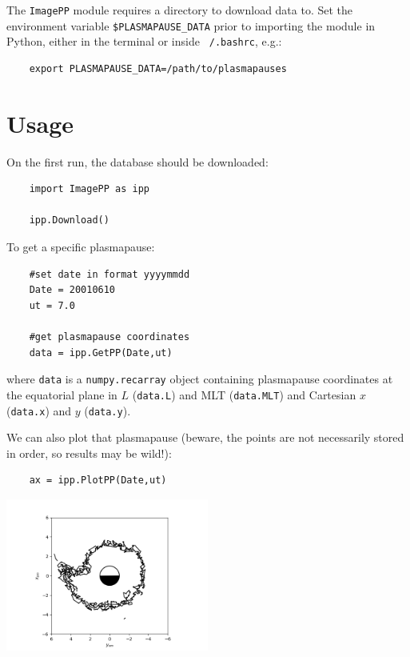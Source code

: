 	The \texttt{ImagePP} module requires a directory to download data to. Set the environment variable \texttt{\$PLASMAPAUSE\_DATA} prior to importing the module in Python, either in the terminal or inside \texttt{~/.bashrc}, e.g.:
	\begin{verbatim}
	export PLASMAPAUSE_DATA=/path/to/plasmapauses
	\end{verbatim}
	
	\section{Usage}
	
	On the first run, the database should be downloaded:
	\begin{verbatim}
	import ImagePP as ipp
	
	ipp.Download()
	\end{verbatim}
	
	To get a specific plasmapause:
	\begin{verbatim}
	#set date in format yyyymmdd
	Date = 20010610
	ut = 7.0
	
	#get plasmapause coordinates
	data = ipp.GetPP(Date,ut)
	\end{verbatim}
	
	where \texttt{data} is a \texttt{numpy.recarray} object containing plasmapause coordinates at the equatorial plane in $L$ (\texttt{data.L}) and MLT (\texttt{data.MLT}) and Cartesian $x$ (\texttt{data.x}) and $y$ (\texttt{data.y}).
	
	We can also plot that plasmapause (beware, the points are not necessarily stored in order, so results may be wild!):
	\begin{verbatim}
	ax = ipp.PlotPP(Date,ut)
	\end{verbatim}
	\includegraphics[width=0.5\textwidth]{figures/ch4_ppexample.png}
	


